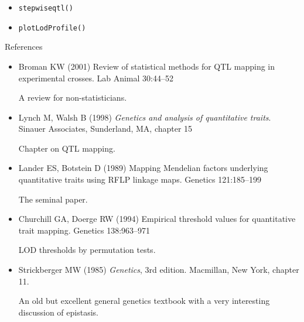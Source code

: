 \documentclass[12pt]{article}
\newcommand{\headsize}{\fontsize{35}{35} \selectfont}
\newcommand{\smallsize}{\fontsize{25}{30} \selectfont}
\newcommand{\smallestsize}{\fontsize{18}{22} \selectfont}
\begin{document}
\vspace{3cm}

\color{mywhite} \smallsize

\hfill \begin{minipage}[t]{9.5in}
\begin{itemize}
\itemsep24pt
\item \verb|stepwiseqtl()|
\item \verb|plotLodProfile()|
\end{itemize} \end{minipage}




\newpage

\headsize \color{myyellow}
\hfill \begin{minipage}{5.75in}
\centering
References
\end{minipage}

\vspace{15mm}

\color{mywhite} \smallestsize

\hspace*{0.5in}
\begin{minipage}{9.5in}
\begin{itemize}
\itemsep12pt
\item Broman KW (2001) Review of statistical methods for QTL mapping in
experimental crosses. Lab Animal 30:44--52

{\color{myblue} A review for non-statisticians.}

\item Lynch M, Walsh B (1998) \emph{Genetics and analysis of quantitative
traits}. Sinauer Associates, Sunderland, MA, chapter 15

{\color{myblue} Chapter on QTL mapping.}

\item Lander ES, Botstein D (1989) Mapping Mendelian factors underlying
quantitative traits using RFLP linkage maps. Genetics
121:185--199

{\color{myblue} The seminal paper.}

\item Churchill GA, Doerge RW (1994) Empirical threshold values for
quantitative trait mapping. Genetics 138:963--971

{\color{myblue} LOD thresholds by permutation tests.}

\item Strickberger MW (1985) \emph{Genetics}, 3rd edition.  Macmillan,
New York, chapter 11.

{\color{myblue} An old but excellent general genetics textbook with a very
interesting discussion of epistasis.}


\end{itemize}
\end{minipage}
\end{document}

